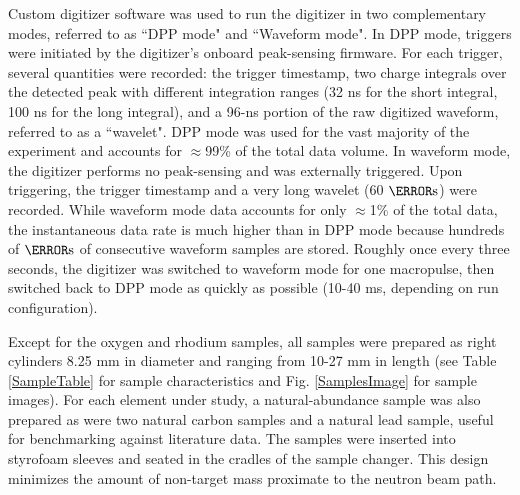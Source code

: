 \documentclass[twocolumn,secnumarabic,amssymb, nobibnotes, aps, prl,
superscriptaddress, nobalancelastpage]{revtex4}
\begin{document}
Custom digitizer software was used to run the 
digitizer in two complementary modes, referred to as ``DPP mode" and ``Waveform 
mode". In DPP mode, triggers were initiated by the digitizer's onboard
peak-sensing firmware. For each trigger, several quantities were recorded: the trigger 
timestamp, two charge integrals over the detected peak with different
integration ranges (32 ns for the short integral, 100 ns for the long integral),
and a 96-ns portion of the raw digitized waveform, referred to as a ``wavelet".
DPP mode was used for the vast majority of the 
experiment and accounts for $\approx$99\% of the total data volume. In waveform mode, 
the digitizer performs no peak-sensing and was externally triggered. Upon 
triggering, the trigger timestamp and a very long wavelet (60 $\micro\second$) 
were recorded. While waveform mode data accounts for only $\approx$1\% of the total data, 
the instantaneous data rate is much higher than in DPP 
mode because hundreds of $\micro\second$ of consecutive waveform samples are 
stored. Roughly once every three seconds, the digitizer was switched to 
waveform mode for one macropulse, then switched back to DPP mode as quickly as
possible (10-40 ms, depending on run configuration).  

Except for the oxygen and rhodium samples, all samples were prepared as right
cylinders 8.25 mm in diameter and ranging from 10-27 mm in length (see
Table \ref{SampleTable} for sample characteristics and Fig. \ref{SamplesImage}
for sample images). For each element under study, a natural-abundance sample
was also prepared as were two natural carbon
samples and a natural lead sample, useful for benchmarking against
literature data. The samples
were inserted into styrofoam sleeves and seated in the cradles of the sample
changer. This design minimizes the amount of non-target mass proximate to the
neutron beam path.
\end{document}
